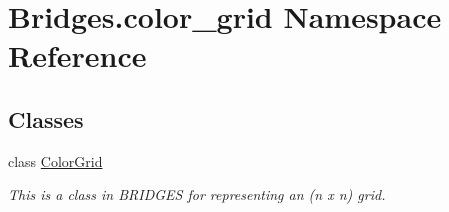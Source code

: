 \hypertarget{namespace_bridges_1_1color__grid}{}\section{Bridges.\+color\+\_\+grid Namespace Reference}
\label{namespace_bridges_1_1color__grid}
\subsection*{Classes}
\begin{DoxyCompactItemize}
\item 
class \hyperlink{class_bridges_1_1color__grid_1_1_color_grid}{Color\+Grid}
\begin{DoxyCompactList}\small\item\em This is a class in B\+R\+I\+D\+G\+E\+S for representing an (n x n) grid. \end{DoxyCompactList}\end{DoxyCompactItemize}
